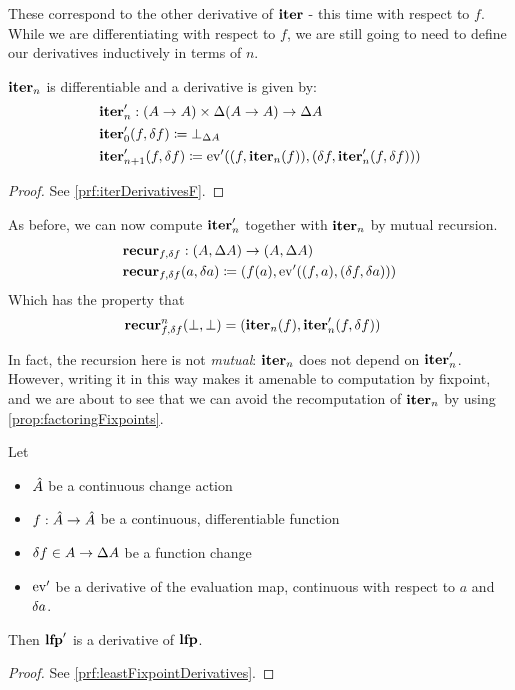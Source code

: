 These correspond to the other derivative of $\textbf{iter}$ - this time with respect to
$f$. While we are differentiating with respect to $f$, we are still going to
need to define our derivatives inductively in terms of $n$.

\begin{prop}[name=Derivative of the iteration map with respect to $f$, restate=iterDerivativesF]
  \label{prop:iterDerivativesF}
  $\textbf{iter}_n$ is differentiable and a derivative is given by:
  \begin{align*}
    &\textbf{iter}_n' : (A \rightarrow A) \times \Delta (A \rightarrow A) \rightarrow \Delta A\\
    &\textbf{iter}_0' (f, \delta f) \coloneqq \bot_{\Delta A}\\
    &\textbf{iter}_{n+1}' (f, \delta f) \coloneqq \operatorname{ev}'((f, \textbf{iter}_n(f)), (\delta f, \textbf{iter}_n'(f, \delta f)))
  \end{align*}
\end{prop}
\ifproofs
\begin{proof}
  See \cref{prf:iterDerivativesF}.
\end{proof}
\fi

As before, we can now compute $\textbf{iter}_n'$ together with $\textbf{iter}_n$ by
mutual recursion. 
\begin{align*}
  &\textbf{recur}_{f, \delta f} : (A, \Delta A) \rightarrow (A, \Delta A)\\
  &\textbf{recur}_{f, \delta f} (a, \delta a) \coloneqq (f(a), \operatorname{ev}'((f, a), (\delta f, \delta a)))
\end{align*}
Which has the property that
\begin{align*}
  &\textbf{recur}_{f, \delta f}^n (\bot, \bot) = (\textbf{iter}_n(f), \textbf{iter}_n'(f, \delta f))
\end{align*}

In fact, the recursion here is not \emph{mutual}: $\textbf{iter}_n$ does
not depend on $\textbf{iter}_n'$. However, writing it in this way makes it
amenable to computation by fixpoint, and we are about to see that we can avoid
the recomputation of $\textbf{iter}_n$ by using \cref{prop:factoringFixpoints}.

\begin{thm}[name=Derivatives of least fixpoint operators, restate=leastFixpointDerivatives]
  \label{thm:leastFixpointDerivatives}
  Let
  \begin{itemize}
    \item $\hat{A}$ be a continuous change action
    \item $f : \hat{A} \rightarrow \hat{A}$ be a continuous, differentiable function
    \item $\delta f \in A \rightarrow \Delta A$ be a function change
    \item $\operatorname{ev}'$ be a derivative of the evaluation map, continuous with
      respect to $a$ and $\delta a$.
  \end{itemize}
  Then $\textbf{lfp}'$ is a derivative of $\textbf{lfp}$.
\end{thm}
\ifproofs
\begin{proof}
  See \cref{prf:leastFixpointDerivatives}.
\end{proof}
\fi

